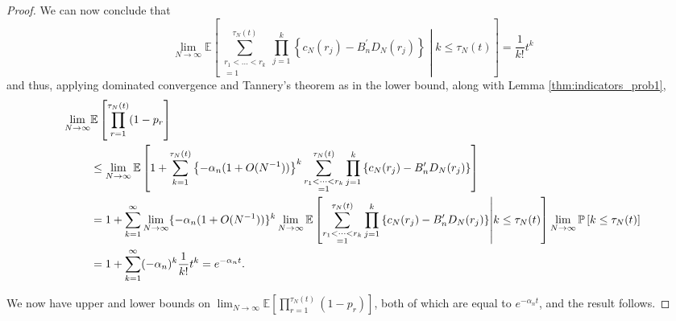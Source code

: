 \documentclass{article}
\newcommand{\Prob}{\mathbb{P}}
\newcommand{\E}{\mathbb{E}}
\newcommand{\1}[1]{\mathbbm{1}_{#1}}
\begin{document}
\begin{proof}
We can now conclude that
\begin{equation}
\lim_{N\to\infty} \E \left[ \sum_{\substack{r_1<\dots<r_k \\ =1}}^{\tau_N(t)}\prod_{j=1}^k 
\left\{ c_N(r_j) - B_n^\prime D_N(r_j) \right\} \middle| k\leq \tau_N(t) \right]
= \frac{1}{k!} t^k
\end{equation}
and thus, applying dominated convergence and Tannery's theorem as in the lower bound, along with Lemma \ref{thm:indicators_prob1},
\begin{align}
\lim_{N\to\infty} &\E\left[ \prod_{r=1}^{\tau_N(t)} (1-p_r \right] \notag\\
&\leq \lim_{N\to\infty} \E\left[
1 + \sum_{k=1}^{\tau_N(t)} \left\{- \alpha_n (1+O(N^{-1}))\right\}^k \sum_{\substack{r_1<\dots<r_k \\ =1}}^{\tau_N(t)}\prod_{j=1}^k 
\left\{ c_N(r_j) - B_n^\prime D_N(r_j) \right\} \right] \notag\\
&= 1 + \sum_{k=1}^\infty \lim_{N\to\infty} \{ -\alpha_n(1+O(N^{-1})) \}^k
\lim_{N\to\infty} \E \left[ \sum_{\substack{r_1<\dots<r_k \\ =1}}^{\tau_N(t)}\prod_{j=1}^k 
\left\{ c_N(r_j) - B_n^\prime D_N(r_j) \right\} \middle| k\leq \tau_N(t) \right]
\lim_{N\to\infty} \Prob\left[ k\leq \tau_N(t) \right] \notag\\
&= 1+ \sum_{k=1}^\infty (-\alpha_n)^k \frac{1}{k!} t^k
= e^{-\alpha_n t} .
\end{align}

We now have upper and lower bounds on $\lim_{N\to\infty} \E\left[ \prod_{r=1}^{\tau_N(t)} (1-p_r) \right]$, both of which are equal to $e^{-\alpha_n t}$, and the result follows.
\end{proof}
\end{document}
